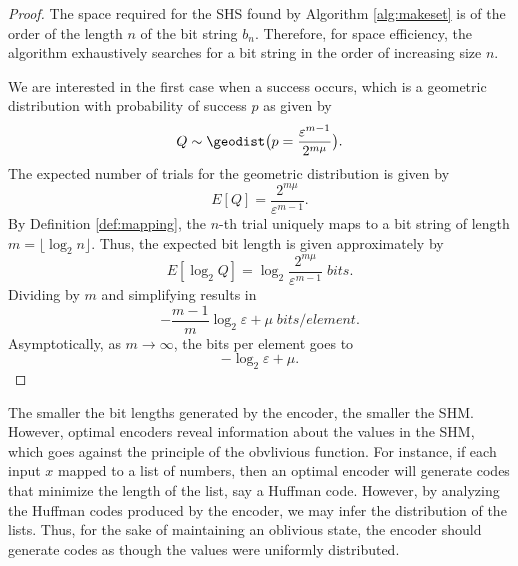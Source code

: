 \documentclass[
  letterpaper,
  DIV=11,
  numbers=noendperiod]{scrartcl}
\theoremstyle{remark}
\begin{document}
\begin{proof}
The space required for the SHS found by Algorithm \ref{alg:makeset} is
of the order of the length \(n\) of the bit string \(b_n\). Therefore,
for space efficiency, the algorithm exhaustively searches for a bit
string in the order of increasing size \(n\).

We are interested in the first case when a success occurs, which is a
geometric distribution with probability of success \(p\) as given by
\begin{equation}
    Q \sim \geodist\bigl(p = \frac{\varepsilon^{m-1}}{2^{m \mu}}\bigr).
\end{equation} The expected number of trials for the geometric
distribution is given by \begin{equation}
\label{eq:exp_trials}
    E[Q] = \frac{2^{m \mu}}{\varepsilon^{m-1}}.
\end{equation} By Definition \ref{def:mapping}, the \(n\)-th trial
uniquely maps to a bit string of length
\(m = \lfloor \log_2 n \rfloor\). Thus, the expected bit length is given
approximately by \begin{equation}
    E[\log_2 Q] = \log_2 \frac{2^{m \mu}}{\varepsilon^{m-1}}\; \si{bits}.
\end{equation} Dividing by \(m\) and simplifying results in
\begin{equation}
    -\frac{m-1}{m} \log_2 \varepsilon + \mu\; \si{bits \per element}.
\end{equation} Asymptotically, as \(m \to \infty\), the bits per element
goes to \begin{equation}
    -\log_2 \varepsilon + \mu.
\end{equation}
\end{proof}

The smaller the bit lengths generated by the encoder, the smaller the
SHM. However, optimal encoders reveal information about the values in
the SHM, which goes against the principle of the obvlivious function.
For instance, if each input \(x\) mapped to a list of numbers, then an
optimal encoder will generate codes that minimize the length of the
list, say a Huffman code. However, by analyzing the Huffman codes
produced by the encoder, we may infer the distribution of the lists.
Thus, for the sake of maintaining an oblivious state, the encoder should
generate codes as though the values were uniformly distributed.
\end{document}
